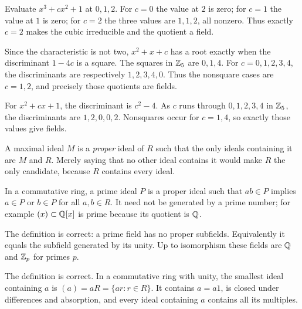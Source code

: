 Evaluate $x^3+cx^2+1$ at $0,1,2$. For $c=0$ the value at $2$ is zero; for $c=1$ the value at $1$ is zero; for $c=2$ the three values are $1,1,2$, all nonzero. Thus exactly $c=2$ makes the cubic irreducible and the quotient a field.

Since the characteristic is not two, $x^2+x+c$ has a root exactly when the discriminant $1-4c$ is a square. The squares in $\mathbb{Z}_5$ are $0,1,4$. For $c=0,1,2,3,4$, the discriminants are respectively $1,2,3,4,0$. Thus the nonsquare cases are $c=1,2$, and precisely those quotients are fields.

For $x^2+cx+1$, the discriminant is $c^2-4$. As $c$ runs through $0,1,2,3,4$ in $\mathbb{Z}_5$, the discriminants are $1,2,0,0,2$. Nonsquares occur for $c=1,4$, so exactly those values give fields.

A maximal ideal $M$ is a \emph{proper} ideal of $R$ such that the only ideals containing it are $M$ and $R$. Merely saying that no other ideal contains it would make $R$ the only candidate, because $R$ contains every ideal.

In a commutative ring, a prime ideal $P$ is a proper ideal such that $ab\in P$ implies $a\in P$ or $b\in P$ for all $a,b\in R$. It need not be generated by a prime number; for example $(x)\subset\mathbb{Q}[x]$ is prime because its quotient is $\mathbb{Q}$.

The definition is correct: a prime field has no proper subfields. Equivalently it equals the subfield generated by its unity. Up to isomorphism these fields are $\mathbb{Q}$ and $\mathbb{Z}_p$ for primes $p$.

The definition is correct. In a commutative ring with unity, the smallest ideal containing $a$ is $(a)=aR=\{ar:r\in R\}$. It contains $a=a1$, is closed under differences and absorption, and every ideal containing $a$ contains all its multiples.

